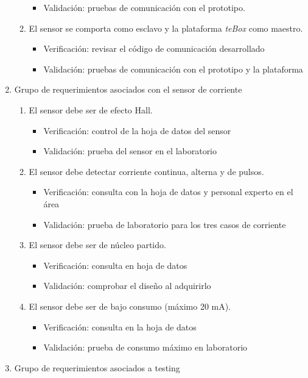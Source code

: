 \documentclass[11pt]{charter}
\begin{document}
\begin{enumerate}
\begin{enumerate}
\begin{itemize}
			\item Validación: pruebas de comunicación con el prototipo.
		\end{itemize}
	\item El sensor se comporta como esclavo y la plataforma \textit{teBox} como maestro.
		\begin{itemize}
			\item Verificación: revisar el código de comunicación desarrollado 
			\item Validación: pruebas de comunicación con el prototipo y la plataforma 
		\end{itemize}
	\end{enumerate}
\item Grupo de requerimientos asociados con el sensor de corriente
	\begin{enumerate}
	\item El sensor debe ser de efecto Hall.
		\begin{itemize}
			\item Verificación: control de la hoja de datos del sensor
			\item Validación: prueba del sensor en el laboratorio
		\end{itemize}
	\item El sensor debe detectar corriente continua, alterna y de pulsos.
		\begin{itemize}
			\item Verificación: consulta con la hoja de datos y personal experto en el área
			\item Validación: prueba de laboratorio para los tres casos de corriente 
		\end{itemize}
	\item El sensor debe ser de núcleo partido.
		\begin{itemize}
			\item Verificación: consulta en hoja de datos
			\item Validación: comprobar el diseño al adquirirlo 
		\end{itemize}
	\item El sensor debe ser de bajo consumo (máximo 20 mA).
		\begin{itemize}
			\item Verificación: consulta en la hoja de datos
			\item Validación: prueba de consumo máximo en laboratorio 
		\end{itemize}
	\end{enumerate}
\item Grupo de requerimientos asociados a testing

\end{enumerate}
\end{document}
